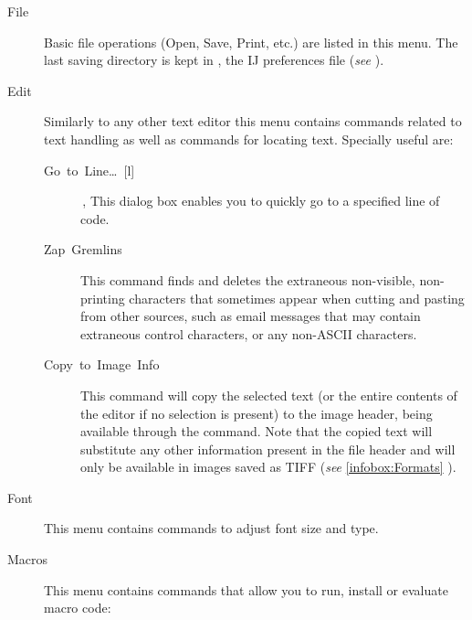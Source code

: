 \begin{description}
\item [{\textsf{File}\emph{\lyxarrow{}}}] Basic file operations (Open,
Save, Print, etc.) are listed in this menu. The last saving directory
is kept in , the IJ preferences file (\emph{see}
).
\item [{\textsf{Edit}\emph{\lyxarrow{}}}] Similarly to any other text
editor this menu contains commands related to text handling as well
as commands for locating text. Specially useful are:

\begin{description}
\item [{\textsf{Go\ to\ Line\ldots{}\ {[}l{]}}}] \,,
This dialog box enables you to quickly go to a specified line of code.
\item [{\textsf{Zap\ Gremlins}}] This command finds and deletes the extraneous
non-visible, non-printing characters that sometimes appear when cutting
and pasting from other sources, such as email messages that may contain
extraneous control characters, or any non-ASCII characters.
\item [{\textsf{Copy\ to\ Image\ Info}}] This command will copy the
selected text (or the entire contents of the editor if no selection
is present) to the image header, being available through the \textsf{}
command. Note that the copied text will substitute any other information
present in the file header and will only be available in images saved
as TIFF (\emph{see} \ref{infobox:Formats} ).
\end{description}
\item [{\textsf{Font}\emph{\lyxarrow{}}}] This menu contains commands
to adjust font size and type. 
\item [{\textsf{Macros}\emph{\lyxarrow{}}}] This menu contains commands
that allow you to run, install or evaluate macro code:


\end{description}
